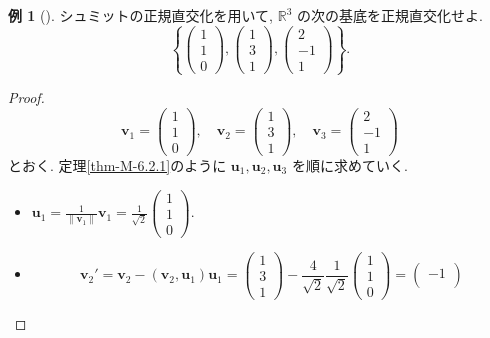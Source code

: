 \documentclass[dvipdfmx,a4paper,11pt]{article} %
\theoremstyle{definition}
\newtheorem{eg}[thm]{例}
\begin{document}
\begin{eg}[{\cite[例題6.2.1]{M}}]
シュミットの正規直交化を用いて, $\mathbb{R}^3$ の次の基底を正規直交化せよ.
\[
\left\{
\begin{pmatrix}
1\\
1\\
0
\end{pmatrix},
\begin{pmatrix}
1\\
3\\
1
\end{pmatrix},
\begin{pmatrix}
2\\
-1\\
1
\end{pmatrix}
\right\}.
\]
\end{eg}
\begin{proof}
\[
\bm{v}_1=
\begin{pmatrix}
1\\
1\\
0
\end{pmatrix},
\quad
\bm{v}_2=
\begin{pmatrix}
1\\
3\\
1
\end{pmatrix},
\quad
\bm{v}_3=
\begin{pmatrix}
2\\
-1\\
1
\end{pmatrix}
\]
とおく. 定理\ref{thm-M-6.2.1}のように $\bm{u}_1,\bm{u}_2,\bm{u}_3$ を順に求めていく.
\begin{itemize}
\item \(
\bm{u}_1
=
\frac{1}{\lVert \bm{v}_1\rVert}\bm{v}_1
=
\frac{1}{\sqrt{2}}
\begin{pmatrix}
1\\
1\\
0
\end{pmatrix}.
\)
\item 
\[
\bm{v}_2'
=\bm{v}_2-(\bm{v}_2,\bm{u}_1)\bm{u}_1
=
\begin{pmatrix}
1\\
3\\
1
\end{pmatrix}
-\frac{4}{\sqrt{2}}\frac{1}{\sqrt{2}}
\begin{pmatrix}
1\\
1\\
0
\end{pmatrix}=
\begin{pmatrix}
-1\\

\end{pmatrix}\]
\end{itemize}
\end{proof}
\end{document}
